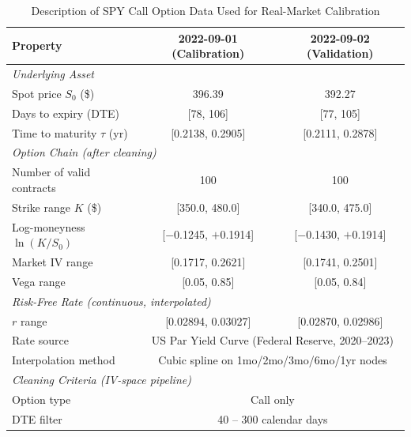 \begin{table}[htbp]
  \centering
  \caption{Description of SPY Call Option Data Used for Real-Market Calibration}
  \label{tab:spy_data}
  \begin{tabular}{lcc}
    \toprule
    \textbf{Property} & \textbf{2022-09-01 (Calibration)} & \textbf{2022-09-02 (Validation)} \\
    \midrule
    \multicolumn{3}{l}{\textit{Underlying Asset}} \\
    \quad Spot price $S_0$ (\$)        & 396.39 & 392.27 \\
    \quad Days to expiry (DTE)         & [78, 106] & [77, 105] \\
    \quad Time to maturity $\tau$ (yr) & [0.2138, 0.2905] & [0.2111, 0.2878] \\
    \midrule
    \multicolumn{3}{l}{\textit{Option Chain (after cleaning)}} \\
    \quad Number of valid contracts    & 100 & 100 \\
    \quad Strike range $K$ (\$)        & [350.0, 480.0] & [340.0, 475.0] \\
    \quad Log-moneyness $\ln(K/S_0)$   & [$-$0.1245, $+$0.1914] & [$-$0.1430, $+$0.1914] \\
    \quad Market IV range              & [0.1717, 0.2621] & [0.1741, 0.2501] \\
    \quad Vega range                   & [0.05, 0.85] & [0.05, 0.84] \\
    \midrule
    \multicolumn{3}{l}{\textit{Risk-Free Rate (continuous, interpolated)}} \\
    \quad $r$ range                    & [0.02894, 0.03027] & [0.02870, 0.02986] \\
    \quad Rate source                  & \multicolumn{2}{c}{US Par Yield Curve (Federal Reserve, 2020--2023)} \\
    \quad Interpolation method         & \multicolumn{2}{c}{Cubic spline on 1mo/2mo/3mo/6mo/1yr nodes} \\
    \midrule
    \multicolumn{3}{l}{\textit{Cleaning Criteria (IV-space pipeline)}} \\
    \quad Option type                  & \multicolumn{2}{c}{Call only} \\
    \quad DTE filter                   & \multicolumn{2}{c}{40 -- 300 calendar days} \\

\end{tabular}
\end{table}
